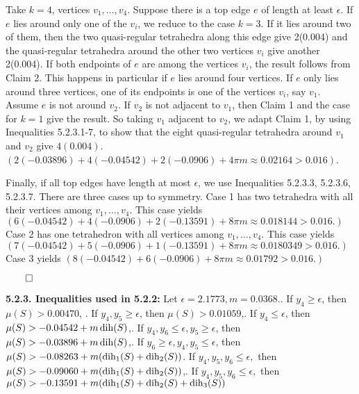 Take $k=4$, vertices $v_1,\dots,v_4$.  Suppose there is a top edge $e$ of length at least $\epsilon$.  If $e$ lies around only one of the $v_i$, we reduce to the case $k=3$.  If it lies around two of them, then the two quasi-regular tetrahedra along this edge give 2(0.004) and the quasi-regular tetrahedra around the other two vertices $v_i$ give another 2(0.004).  If both endpoints of $e$ are among the vertices $v_i$, the result follows from Claim 2.  This happens in particular if $e$ lies around four vertices.  If $e$ only lies around three vertices, one of its endpoints is one of the vertices $v_i$, say $v_1$.  Assume $e$ is not around $v_2$.  If $v_2$ is not adjacent to $v_1$, then Claim 1 and the case for $k=1$ give the result.  So taking $v_1$ adjacent to $v_2$, we adapt Claim 1, by using Inequalities 5.2.3.1-7, to show that the eight quasi-regular tetrahedra around $v_1$ and $v_2$ give $4(0.004)$.  
$(2(-0.03896)+4(-0.04542)+2(-0.0906)+4\pi m \approx 0.02164 > 0.016)$.

Finally, if all top edges have length at most $\epsilon$, we use Inequalities 5.2.3.3, 5.2.3.6, 5.2.3.7.  
There are three cases up to symmetry.  Case 1 has two tetrahedra with all their vertices among $v_1,\dots,v_4$.  This case yields 
$(6(-0.04542)+4(-0.0906)+2(-0.13591)+8 \pi m \approx 0.018144 > 0.016.)$  Case 2 has one tetrahedron with all vertices among $v_1,\dots,v_4$.  This case yields 
$(7(-0.04542)+5(-0.0906)+1(-0.13591)+8 \pi m \approx 0.0180349 > 0.016.)$  Case 3 yields 
$(8(-0.04542)+6(-0.0906)+8 \pi m \approx 0.01792 > 0.016.)$  

$\qed$

{\bf 5.2.3. Inequalities used in 5.2.2:}
\smallskip
\hbox{}
Let $\epsilon=2.1773, m=0.0368.$.  If $y_4 \geq \epsilon$, then $\mu(S) > 0.00470$, .  If $y_4,y_5 \geq \epsilon$, then $\mu(S) > 0.01059$,.  If $y_4 \leq \epsilon$, then $\mu(S) > -0.04542 + m \operatorname{dih}(S)$,.  If $y_4,y_6 \leq \epsilon, y_5 \geq \epsilon$, then 
	$\mu (S)>-0.03896 + m \operatorname{dih}(S)$,.  If $y_6 \geq \epsilon, y_4,y_5 \leq \epsilon$, then $\mu (S) > -0.08263 + m (\operatorname{dih}_1(S)+\operatorname{dih}_2(S))$.  If $y_4,y_5,y_6\leq\epsilon,$ then $\mu(S) > -0.09060 + m(\operatorname{dih}_1(S)+\operatorname{dih}_2(S))$,.  If $y_4,y_5,y_6 \leq\epsilon,$ then $\mu(S) > -0.13591 + m ( \operatorname{dih}_1(S)+\operatorname{dih}_2(S)+\operatorname{dih}_3(S))$\newline




